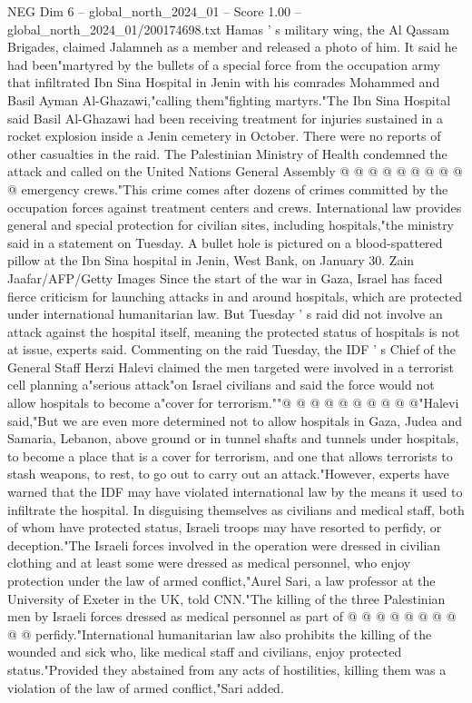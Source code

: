 \begin{textsample}{NEG Dim 6 – global\_north\_2024\_01 – Score 1.00 – global\_north\_2024\_01/200174698.txt}
Hamas ' s military wing, the Al Qassam Brigades, claimed Jalamneh as a member and released a photo of him.
It said he had been"martyred by the bullets of a special force from the occupation army that infiltrated Ibn Sina Hospital in Jenin with his comrades Mohammed and Basil Ayman Al-Ghazawi,"calling them"fighting martyrs."The Ibn Sina Hospital said Basil Al-Ghazawi had been receiving treatment for injuries sustained in a rocket explosion inside a Jenin cemetery in October.
There were no reports of other casualties in the raid.
The Palestinian Ministry of Health condemned the attack and called on the United Nations General Assembly @ @ @ @ @ @ @ @ @ @ emergency crews."This crime comes after dozens of crimes committed by the occupation forces against treatment centers and crews.
International law provides general and special protection for civilian sites, including hospitals,"the ministry said in a statement on Tuesday.
A bullet hole is pictured on a blood-spattered pillow at the Ibn Sina hospital in Jenin, West Bank, on January 30.
Zain Jaafar/AFP/Getty Images Since the start of the war in Gaza, Israel has faced fierce criticism for launching attacks in and around hospitals, which are protected under international humanitarian law.
But Tuesday ' s raid did not involve an attack against the hospital itself, meaning the protected status of hospitals is not at issue, experts said.
Commenting on the raid Tuesday, the IDF ' s Chief of the General Staff Herzi Halevi claimed the men targeted were involved in a terrorist cell planning a"serious attack"on Israel civilians and said the force would not allow hospitals to become a"cover for terrorism.""@ @ @ @ @ @ @ @ @ @"Halevi said,"But we are even more determined not to allow hospitals in Gaza, Judea and Samaria, Lebanon, above ground or in tunnel shafts and tunnels under hospitals, to become a place that is a cover for terrorism, and one that allows terrorists to stash weapons, to rest, to go out to carry out an attack."However, experts have warned that the IDF may have violated international law by the means it used to infiltrate the hospital.
In disguising themselves as civilians and medical staff, both of whom have protected status, Israeli troops may have resorted to perfidy, or deception."The Israeli forces involved in the operation were dressed in civilian clothing and at least some were dressed as medical personnel, who enjoy protection under the law of armed conflict,"Aurel Sari, a law professor at the University of Exeter in the UK, told CNN."The killing of the three Palestinian men by Israeli forces dressed as medical personnel as part of @ @ @ @ @ @ @ @ @ @ perfidy."International humanitarian law also prohibits the killing of the wounded and sick who, like medical staff and civilians, enjoy protected status."Provided they abstained from any acts of hostilities, killing them was a violation of the law of armed conflict,"Sari added.

\end{textsample}
